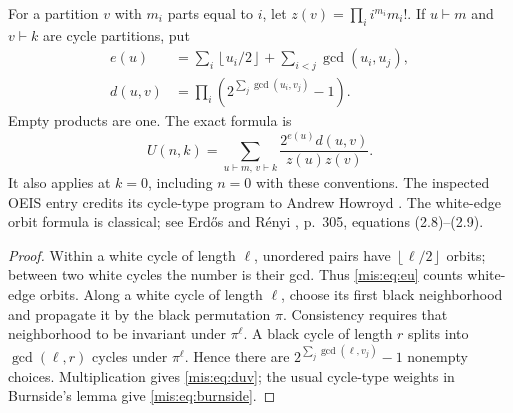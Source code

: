 \documentclass[11pt]{article}
\theoremstyle{remark}\newtheorem{remark}[theorem]{Remark}
\newcommand{\floor}[1]{\left\lfloor #1\right\rfloor}
\begin{document}
For a partition $v$ with $m_i$ parts equal to $i$, let $z(v)=\prod_i i^{m_i}m_i!$. If $u\vdash m$ and $v\vdash k$ are cycle partitions, put
\begin{align}
 e(u)&=\sum_i\floor{u_i/2}+\sum_{i<j}\gcd(u_i,u_j),\label{mis:eq:eu}\\
 d(u,v)&=\prod_i\left(2^{\sum_j\gcd(u_i,v_j)}-1\right).\label{mis:eq:duv}
\end{align}
Empty products are one. The exact formula is
\begin{equation}\label{mis:eq:burnside}
 U(n,k)=\sum_{u\vdash m,\,v\vdash k}\frac{2^{e(u)}d(u,v)}{z(u)z(v)}.
\end{equation}
It also applies at $k=0$, including $n=0$ with these conventions. The inspected OEIS entry credits its cycle-type program to Andrew Howroyd \cite{oeis}. The white-edge orbit formula is classical; see Erd\H{o}s and R\'enyi \cite{er}, p.~305, equations (2.8)--(2.9).

\begin{proof}
Within a white cycle of length $\ell$, unordered pairs have $\floor{\ell/2}$ orbits; between two white cycles the number is their gcd. Thus \eqref{mis:eq:eu} counts white-edge orbits. Along a white cycle of length $\ell$, choose its first black neighborhood and propagate it by the black permutation $\pi$. Consistency requires that neighborhood to be invariant under $\pi^\ell$. A black cycle of length $r$ splits into $\gcd(\ell,r)$ cycles under $\pi^\ell$. Hence there are $2^{\sum_j\gcd(\ell,v_j)}-1$ nonempty choices. Multiplication gives \eqref{mis:eq:duv}; the usual cycle-type weights in Burnside's lemma give \eqref{mis:eq:burnside}.
\end{proof}
\end{document}
